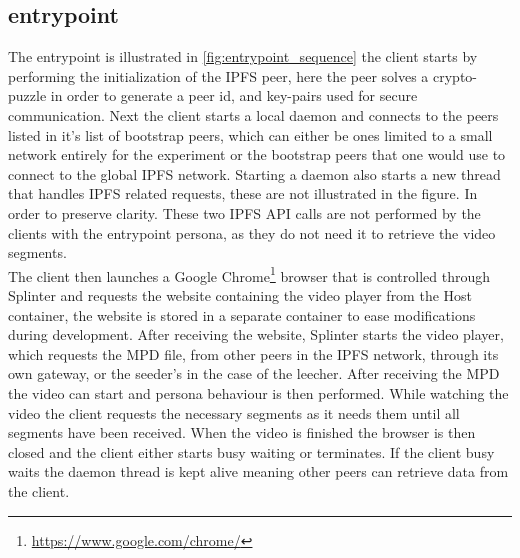 

\subsection{entrypoint}
\label{sec:experiment_entrypoint}

The entrypoint is illustrated in \ref{fig:entrypoint_sequence} the client starts by performing the initialization of the IPFS peer, here the peer solves a crypto-puzzle in order to generate a peer id, and key-pairs used for secure communication.
Next the client starts a local daemon and connects to the peers listed in it's list of bootstrap peers, which can either be ones limited to a small network entirely for the experiment or the bootstrap peers that one would use to connect to the global \acs{IPFS} network.
Starting a daemon also starts a new thread that handles \acs{IPFS} related requests, these are not illustrated in the figure. In order to preserve clarity. These two \acs{IPFS} \acs{API} calls are not performed by the clients with the entrypoint persona, as they do not need it to retrieve the video segments.\\
The client then launches a Google Chrome\footnote{\url{https://www.google.com/chrome/}} browser that is controlled through Splinter and requests the website containing the video player from the Host container, the website is stored in a separate container to ease modifications during development.
After receiving the website, Splinter starts the video player, which requests the \acs{MPD} file, from other peers in the \acs{IPFS} network, through its own gateway, or the seeder's in the case of the leecher.
After receiving the \acs{MPD} the video can start and persona behaviour is then performed. While watching the video the client requests the necessary segments as it needs them until all segments have been received.
When the video is finished the browser is then closed and the client either starts busy waiting or terminates. If the client busy waits the daemon thread is kept alive meaning other peers can retrieve data from the client.\\



